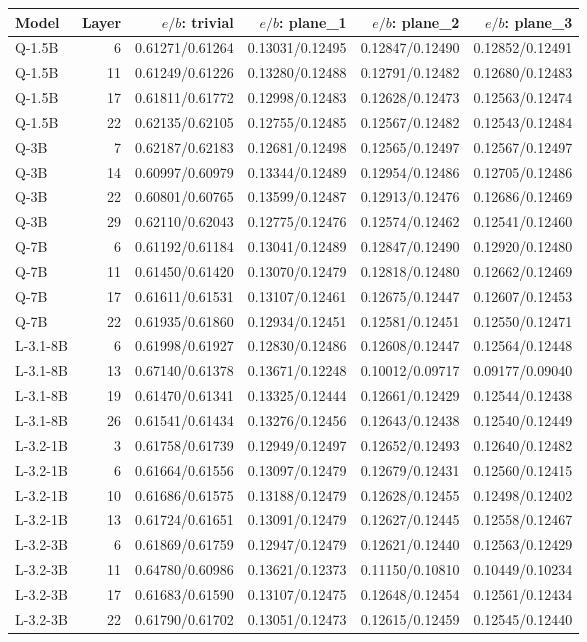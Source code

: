 \begin{tabular}{lrrrrr}
\toprule
Model & Layer & $e/b$: trivial & $e/b$: plane\_1 & $e/b$: plane\_2 & $e/b$: plane\_3 \\
\midrule
Q-1.5B & 6 & 0.61271/0.61264 & 0.13031/0.12495 & 0.12847/0.12490 & 0.12852/0.12491 \\
Q-1.5B & 11 & 0.61249/0.61226 & 0.13280/0.12488 & 0.12791/0.12482 & 0.12680/0.12483 \\
Q-1.5B & 17 & 0.61811/0.61772 & 0.12998/0.12483 & 0.12628/0.12473 & 0.12563/0.12474 \\
Q-1.5B & 22 & 0.62135/0.62105 & 0.12755/0.12485 & 0.12567/0.12482 & 0.12543/0.12484 \\
Q-3B & 7 & 0.62187/0.62183 & 0.12681/0.12498 & 0.12565/0.12497 & 0.12567/0.12497 \\
Q-3B & 14 & 0.60997/0.60979 & 0.13344/0.12489 & 0.12954/0.12486 & 0.12705/0.12486 \\
Q-3B & 22 & 0.60801/0.60765 & 0.13599/0.12487 & 0.12913/0.12476 & 0.12686/0.12469 \\
Q-3B & 29 & 0.62110/0.62043 & 0.12775/0.12476 & 0.12574/0.12462 & 0.12541/0.12460 \\
Q-7B & 6 & 0.61192/0.61184 & 0.13041/0.12489 & 0.12847/0.12490 & 0.12920/0.12480 \\
Q-7B & 11 & 0.61450/0.61420 & 0.13070/0.12479 & 0.12818/0.12480 & 0.12662/0.12469 \\
Q-7B & 17 & 0.61611/0.61531 & 0.13107/0.12461 & 0.12675/0.12447 & 0.12607/0.12453 \\
Q-7B & 22 & 0.61935/0.61860 & 0.12934/0.12451 & 0.12581/0.12451 & 0.12550/0.12471 \\
L-3.1-8B & 6 & 0.61998/0.61927 & 0.12830/0.12486 & 0.12608/0.12447 & 0.12564/0.12448 \\
L-3.1-8B & 13 & 0.67140/0.61378 & 0.13671/0.12248 & 0.10012/0.09717 & 0.09177/0.09040 \\
L-3.1-8B & 19 & 0.61470/0.61341 & 0.13325/0.12444 & 0.12661/0.12429 & 0.12544/0.12438 \\
L-3.1-8B & 26 & 0.61541/0.61434 & 0.13276/0.12456 & 0.12643/0.12438 & 0.12540/0.12449 \\
L-3.2-1B & 3 & 0.61758/0.61739 & 0.12949/0.12497 & 0.12652/0.12493 & 0.12640/0.12482 \\
L-3.2-1B & 6 & 0.61664/0.61556 & 0.13097/0.12479 & 0.12679/0.12431 & 0.12560/0.12415 \\
L-3.2-1B & 10 & 0.61686/0.61575 & 0.13188/0.12479 & 0.12628/0.12455 & 0.12498/0.12402 \\
L-3.2-1B & 13 & 0.61724/0.61651 & 0.13091/0.12479 & 0.12627/0.12445 & 0.12558/0.12467 \\
L-3.2-3B & 6 & 0.61869/0.61759 & 0.12947/0.12479 & 0.12621/0.12440 & 0.12563/0.12429 \\
L-3.2-3B & 11 & 0.64780/0.60986 & 0.13621/0.12373 & 0.11150/0.10810 & 0.10449/0.10234 \\
L-3.2-3B & 17 & 0.61683/0.61590 & 0.13107/0.12475 & 0.12648/0.12454 & 0.12561/0.12434 \\
L-3.2-3B & 22 & 0.61790/0.61702 & 0.13051/0.12473 & 0.12615/0.12459 & 0.12545/0.12440 \\
\bottomrule
\end{tabular}
